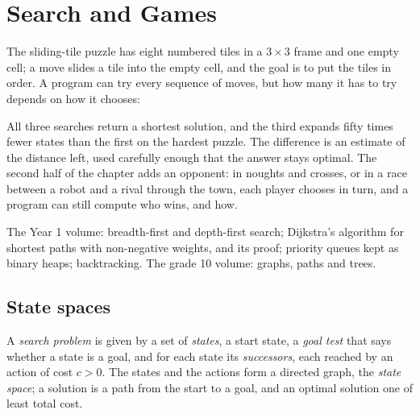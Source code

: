 \chapter{Search and Games}\label{ch:b2:search-and-games}

The sliding-tile puzzle has eight numbered tiles in a $3 \times 3$ frame and one empty cell; a move slides a tile into
the empty cell, and the goal is to put the tiles in order. A program can try every sequence of moves, but how many it
has to try depends on how it chooses:

\label{lst:b2:search-and-games:hook}

\label{out:b2:search-and-games:hook}

All three searches return a shortest solution, and the third expands fifty times fewer states than the first on the
hardest puzzle. The difference is an estimate of the distance left, used carefully enough that the answer stays
optimal. The second half of the chapter adds an opponent: in noughts and crosses, or in a race between a robot and a
rival through the town, each player chooses in turn, and a program can still compute who wins, and how.

\begin{recall}
The Year 1 volume: breadth-first and depth-first search; Dijkstra's algorithm for shortest paths with non-negative
weights, and its proof; priority queues kept as binary heaps; backtracking. The grade 10 volume: graphs, paths and
trees.
\end{recall}

\section{State spaces}\label{sec:b2:search-and-games:state-spaces}

\begin{definition}\label{def:b2:search-and-games:state-space}
A \emph{search problem} is given by a set of \emph{states}, a start state, a \emph{goal
test} that says whether a state is a goal, and for each state its \emph{successors}, each reached by an
action of cost $c > 0$. The states and the actions form a directed graph, the \emph{state space}; a
solution is a path from the start to a goal, and an optimal solution one of least total cost.
\end{definition}


